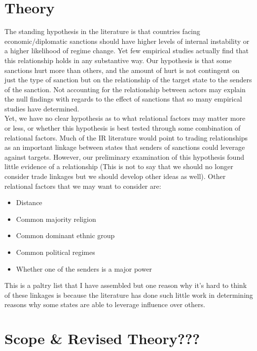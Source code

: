 \section*{Theory}

The standing hypothesis in the literature is that countries facing economic/diplomatic sanctions should have higher levels of internal instability or a higher likelihood of regime change. Yet few empirical studies actually find that this relationship holds in any substantive way. Our hypothesis is that some sanctions hurt more than others, and the amount of hurt is not contingent on just the type of sanction but on the relationship of the target state to the senders of the sanction. Not accounting for the relationship between actors may explain the null findings with regards to the effect of sanctions that so many empirical studies have determined.   \\

Yet, we have no clear hypothesis as to what relational factors may matter more or less, or whether this hypothesis is best tested through some combination of relational factors. Much of the IR literature would point to trading relationships as an important linkage between states that senders of sanctions could leverage against targets. However, our preliminary examination of this hypothesis found little evidence of a relationship (This is not to say that we should no longer consider trade linkages but we should develop other ideas as well). Other relational factors that we may want to consider are:

\begin{itemize}
	\item Distance
	\item Common majority religion
	\item Common dominant ethnic group
	\item Common political regimes
	\item Whether one of the senders is a major power
\end{itemize}

This is a paltry list that I have assembled but one reason why it's hard to think of these linkages is because the literature has done such little work in determining reasons why some states are able to leverage influence over others.

\section*{Scope \& Revised Theory???}


